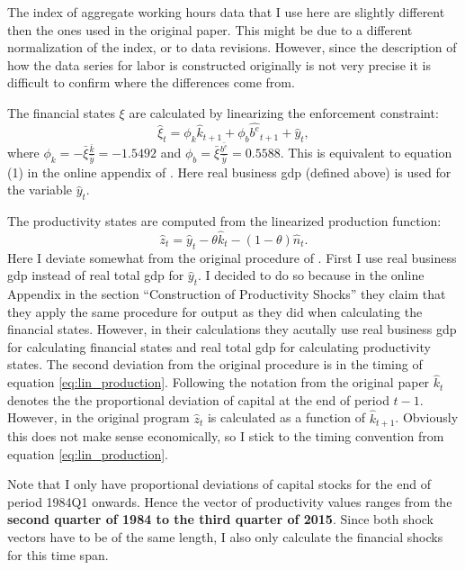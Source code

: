 The index of aggregate working hours data that I use here are slightly
different then the ones used in the original paper. This might be due to a
different normalization of the index, or to data revisions. However, since the
description of how the data series for labor is constructed originally is not
very precise it is difficult to confirm where the differences come from.

The financial states \( \xi \) are calculated by linearizing the enforcement
constraint:
\begin{equation}
\label{eq:fin_shock_correct_timing}
    \hat{\xi}_t = \phi_k \hat{k}_{t+1} + \phi_b \hat{b^e}_{t+1} + \hat{y}_t,
\end{equation}
where \(\phi_k = - \bar{\xi} \frac{\bar{k}}{\bar{y}} = -1.5492\) and \(\phi_b = \bar{\xi} \frac{\bar{b^e}}{\bar{y}} = 0.5588\).
This is equivalent to equation (1) in the online appendix of
\textcite{jerman_macroeconomic_2012}. Here real business gdp (defined above) is
used for the variable \(\hat{y}_t\).

The productivity states are computed from the linearized production function:
\begin{equation}
\label{eq:lin_production}
    \hat{z}_t = \hat{y}_t - \theta \hat{k}_t - (1 - \theta) \hat{n}_t.
\end{equation}
Here I deviate somewhat from the original procedure of
\citeauthor{jerman_macroeconomic_2012}. First I use real business gdp instead
of real total gdp for \(\hat{y}_t\). I decided to do so because in the online
Appendix in the section ``Construction of Productivity Shocks'' they claim that
they apply the same procedure for output as they did when calculating the
financial states. However, in their calculations they acutally use real
business gdp for calculating financial states and real total gdp for
calculating productivity states. The second deviation from the original
procedure is in the timing of equation \ref{eq:lin_production}. Following the
notation from the original paper \(\hat{k}_t\) denotes the the proportional
deviation of capital at the end of period \(t - 1\). However, in the original
program \(\hat{z}_t\) is calculated as a function of \(\hat{k}_{t +
  1}\). Obviously this does not make sense economically, so I stick to the
timing convention from equation \ref{eq:lin_production}.

Note that I only have proportional deviations of capital stocks for the end of
period 1984Q1 onwards. Hence the vector of productivity values ranges from the
\textbf{second quarter of 1984 to the third quarter of 2015}. Since both shock
vectors have to be of the same length, I also only calculate the financial
shocks for this time span.

